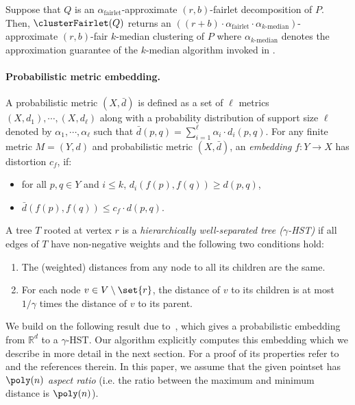 \begin{theorem}\label{thm:fairlet-to-clustering}
Suppose that $Q$ is an $\alpha_{\text{fairlet}}$-approximate $(r,b)$-fairlet decomposition of $P$. Then, $\clusterFairlet(Q)$ returns an $((r+b)\cdot\alpha_{\text{fairlet}}\cdot\alpha_{k\text{-median}})$-approximate $(r,b)$-fair $k$-median clustering of $P$ where $\alpha_{k\text{-median}}$ denotes the approximation guarantee of the $k$-median algorithm invoked in \clusterFairlet.
\end{theorem} 
\fi


\paragraph{Probabilistic metric embedding.}
A probabilistic metric $(X, \bar{d})$ is defined as a set of $\ell$ metrics $(X, d_1), \cdots, (X, d_\ell)$ along with a probability distribution of support size $\ell$ denoted by $\alpha_1, \cdots, \alpha_\ell$ such that $\bar{d}(p,q) = \sum_{i=1}^\ell \alpha_i \cdot d_i(p,q)$. 
For any finite metric $M = (Y,d)$ and probabilistic metric $(X, \bar{d})$, an {\em embedding} $f: Y \rightarrow X$ has distortion $c_f$, if:
\begin{itemize}
\item{for all $p,q \in Y$ and $i \leq k$, $d_i(f(p), f(q)) \geq d(p,q)$,}
\item{$\bar{d}(f(p), f(q)) \leq c_f \cdot d(p,q)$.}
\end{itemize}


\begin{definition}\label{def:HST}
A tree $T$ rooted at vertex $r$ is a \emph{hierarchically well-separated tree ($\gamma$-HST)} if all edges of $T$ have non-negative weights and the following two conditions hold:
\begin{enumerate}
\item{The (weighted) distances from any node to all its children are the same.}
\item{For each node $v \in V\setminus\set{r}$, the distance of $v$ to its children is at most ${1/\gamma}$ times the distance of $v$ to its parent.}
\end{enumerate}
\end{definition}

We build on the following result due to~\cite{bartal1996probabilistic}, which gives a probabilistic embedding from $\mathbb{R}^d$ to a $\gamma$-HST. Our algorithm explicitly computes this embedding which we describe in more detail in the next section. For a proof of its properties refer to~\citep{indyk2001algorithmic} and the references therein. In this paper, we assume that the given pointset has $\poly(n)$ {\em aspect ratio} (i.e. the ratio between the maximum and minimum distance is $\poly(n)$).

